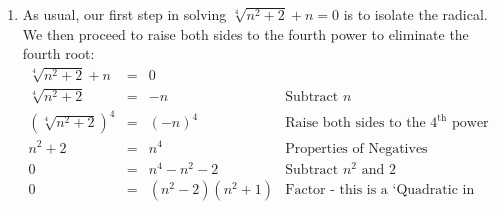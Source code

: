 \documentclass{ximera}
\begin{document}
{{{\begin{example}
\begin{enumerate}
\[\begin{array}{rclr}
4x - 1 & = & 5 - 8x - 4\sqrt{1-2x} &  \\ [2pt]

12x - 6 & = & -4\sqrt{1-2x} & \text{Subtract $5$, add $8x$}\\ [2pt]

(12x-6)^2 & = & (-4\sqrt{1-2x})^2 & \text{Square both sides} \\[2pt]

144x^2 - 144x + 36 & = & 16(1-2x) & \\ [2pt]

144x^2 -  144x + 36 & = & 16 - 32x & \\[2pt]

144x^2 - 112x + 20 & = & 0 & \text{Subtract $16$, add $32x$} \\[2pt]

4(36x^2 - 28x + 5) & = & 0 & \text{Factor} \\[2pt]

4(2x-1)(18x - 5) & = & 0 & \text{Factor some more} \\

\end{array} \] From the Zero Product Property, we know either $2x-1 = 0$ or $18x - 5 = 0$.  The former gives $x = \frac{1}{2}$ while the latter gives us $x = \frac{5}{18}$.  Since we squared both sides of the equation (twice!), we need to check for extraneous solutions.  We find $x = \frac{5}{18}$ to be extraneous, so our only solution is $x = \frac{1}{2}$.

\item As usual, our first step in solving $\sqrt[4]{n^2 + 2} + n = 0$ is to isolate the radical.  We then proceed to raise both sides to the fourth power to eliminate the fourth root:\[ \begin{array}{rclr}

\sqrt[4]{n^2 + 2} + n & = & 0 &  \\

\sqrt[4]{n^2 + 2} & = &  -n & \text{Subtract $n$} \\

(\sqrt[4]{n^2 + 2})^4 & = & (-n)^4 & \text{Raise both sides to the $4^{\text{th}}$ power} \\

n^2 + 2 & = & n^4 & \text{Properties of Negatives}\\

0 & = & n^{4} - n^2 - 2 & \text{Subtract $n^2$ and $2$} \\

0 & = & (n^2 - 2)(n^2 + 1) & \text{Factor - this is a `Quadratic in Disguise'} \\


\end{array}\]
\end{enumerate}
\end{example}}}}
\end{document}
